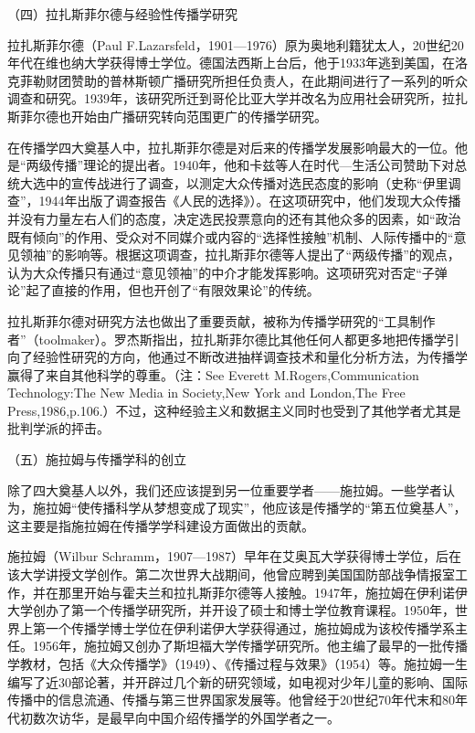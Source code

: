 \documentclass[UTF8,12pt]{ctexart}
\numberwithin{equation}{section} %
\numberwithin{figure}{section}
\numberwithin{table}{section}
\begin{document}
	（四）拉扎斯菲尔德与经验性传播学研究
	
	拉扎斯菲尔德（Paul F.Lazarsfeld，1901—1976）原为奥地利籍犹太人，20世纪20年代在维也纳大学获得博士学位。德国法西斯上台后，他于1933年逃到美国，在洛克菲勒财团赞助的普林斯顿广播研究所担任负责人，在此期间进行了一系列的听众调查和研究。1939年，该研究所迁到哥伦比亚大学并改名为应用社会研究所，拉扎斯菲尔德也开始由广播研究转向范围更广的传播学研究。
	
	在传播学四大奠基人中，拉扎斯菲尔德是对后来的传播学发展影响最大的一位。他是“两级传播”理论的提出者。1940年，他和卡兹等人在时代—生活公司赞助下对总统大选中的宣传战进行了调查，以测定大众传播对选民态度的影响（史称“伊里调查”，1944年出版了调查报告《人民的选择》）。在这项研究中，他们发现大众传播并没有力量左右人们的态度，决定选民投票意向的还有其他众多的因素，如“政治既有倾向”的作用、受众对不同媒介或内容的“选择性接触”机制、人际传播中的“意见领袖”的影响等。根据这项调查，拉扎斯菲尔德等人提出了“两级传播”的观点，认为大众传播只有通过“意见领袖”的中介才能发挥影响。这项研究对否定“子弹论”起了直接的作用，但也开创了“有限效果论”的传统。
	
	拉扎斯菲尔德对研究方法也做出了重要贡献，被称为传播学研究的“工具制作者”（toolmaker）。罗杰斯指出，拉扎斯菲尔德比其他任何人都更多地把传播学引向了经验性研究的方向，他通过不断改进抽样调查技术和量化分析方法，为传播学赢得了来自其他科学的尊重。（注：See Everett M.Rogers,Communication Technology:The New Media in Society,New York and London,The Free Press,1986,p.106.）不过，这种经验主义和数据主义同时也受到了其他学者尤其是批判学派的抨击。
	
	（五）施拉姆与传播学科的创立
	
	除了四大奠基人以外，我们还应该提到另一位重要学者——施拉姆。一些学者认为，施拉姆“使传播科学从梦想变成了现实”，他应该是传播学的“第五位奠基人”，这主要是指施拉姆在传播学学科建设方面做出的贡献。
	
	施拉姆（Wilbur Schramm，1907—1987）早年在艾奥瓦大学获得博士学位，后在该大学讲授文学创作。第二次世界大战期间，他曾应聘到美国国防部战争情报室工作，并在那里开始与霍夫兰和拉扎斯菲尔德等人接触。1947年，施拉姆在伊利诺伊大学创办了第一个传播学研究所，并开设了硕士和博士学位教育课程。1950年，世界上第一个传播学博士学位在伊利诺伊大学获得通过，施拉姆成为该校传播学系主任。1956年，施拉姆又创办了斯坦福大学传播学研究所。他主编了最早的一批传播学教材，包括《大众传播学》（1949）、《传播过程与效果》（1954）等。施拉姆一生编写了近30部论著，并开辟过几个新的研究领域，如电视对少年儿童的影响、国际传播中的信息流通、传播与第三世界国家发展等。他曾经于20世纪70年代末和80年代初数次访华，是最早向中国介绍传播学的外国学者之一。
	
\end{document}
